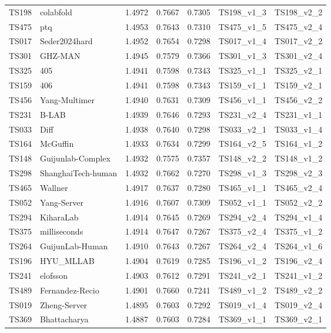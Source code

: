 \begin{table}[ht]
{\begin{tabular}{llrrrll}
TS198 & colabfold & 1.4972 & 0.7667 & 0.7305 & TS198\_v1\_3 & TS198\_v2\_2 \\ 
TS475 & ptq & 1.4953 & 0.7643 & 0.7310 & TS475\_v1\_5 & TS475\_v2\_4 \\ 
TS017 & Seder2024hard & 1.4952 & 0.7654 & 0.7298 & TS017\_v1\_4 & TS017\_v2\_2 \\ 
TS301 & GHZ-MAN & 1.4945 & 0.7579 & 0.7366 & TS301\_v1\_3 & TS301\_v2\_4 \\ 
TS325 & 405 & 1.4941 & 0.7598 & 0.7343 & TS325\_v1\_1 & TS325\_v2\_1 \\ 
TS159 & 406 & 1.4941 & 0.7598 & 0.7343 & TS159\_v1\_1 & TS159\_v2\_1 \\ 
TS456 & Yang-Multimer & 1.4940 & 0.7631 & 0.7309 & TS456\_v1\_1 & TS456\_v2\_2 \\ 
TS231 & B-LAB & 1.4939 & 0.7646 & 0.7293 & TS231\_v2\_4 & TS231\_v1\_1 \\ 
TS033 & Diff & 1.4938 & 0.7640 & 0.7298 & TS033\_v2\_1 & TS033\_v1\_4 \\ 
TS164 & McGuffin & 1.4933 & 0.7634 & 0.7299 & TS164\_v2\_5 & TS164\_v1\_2 \\ 
TS148 & Guijunlab-Complex & 1.4932 & 0.7575 & 0.7357 & TS148\_v2\_2 & TS148\_v1\_2 \\ 
TS298 & ShanghaiTech-human & 1.4932 & 0.7662 & 0.7270 & TS298\_v1\_3 & TS298\_v2\_3 \\ 
TS465 & Wallner & 1.4917 & 0.7637 & 0.7280 & TS465\_v1\_1 & TS465\_v2\_4 \\ 
TS052 & Yang-Server & 1.4916 & 0.7607 & 0.7309 & TS052\_v1\_1 & TS052\_v2\_2 \\ 
TS294 & KiharaLab & 1.4914 & 0.7645 & 0.7269 & TS294\_v2\_4 & TS294\_v1\_4 \\ 
TS375 & milliseconds & 1.4914 & 0.7647 & 0.7267 & TS375\_v2\_4 & TS375\_v1\_2 \\ 
TS264 & GuijunLab-Human & 1.4910 & 0.7643 & 0.7267 & TS264\_v2\_4 & TS264\_v1\_6 \\ 
TS196 & HYU\_MLLAB & 1.4904 & 0.7619 & 0.7285 & TS196\_v1\_2 & TS196\_v2\_4 \\ 
TS241 & elofsson & 1.4903 & 0.7612 & 0.7291 & TS241\_v2\_1 & TS241\_v1\_2 \\ 
TS489 & Fernandez-Recio & 1.4901 & 0.7660 & 0.7241 & TS489\_v1\_2 & TS489\_v2\_2 \\ 
TS019 & Zheng-Server & 1.4895 & 0.7603 & 0.7292 & TS019\_v1\_4 & TS019\_v2\_4 \\ 
TS369 & Bhattacharya & 1.4887 & 0.7603 & 0.7284 & TS369\_v1\_1 & TS369\_v2\_1 \\ 

\end{tabular}}
\end{table}
